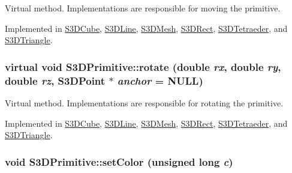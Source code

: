 Virtual method. Implementations are responsible for moving the primitive. 



Implemented in \hyperlink{class_s3_d_cube_ab21a1988528297602452984f8a3c093e}{S3DCube}, \hyperlink{class_s3_d_line_a38203e499c32f14ff5da3b7c17861881}{S3DLine}, \hyperlink{class_s3_d_mesh_a15edf10bf8a749627f11235c618734f7}{S3DMesh}, \hyperlink{class_s3_d_rect_a97fcf9a2380d07c59bc12db8bd5949bc}{S3DRect}, \hyperlink{class_s3_d_tetraeder_a3acda1d545e2f078abf299b1c424b7bc}{S3DTetraeder}, and \hyperlink{class_s3_d_triangle_a7f168122e4ed627fcb6489852a56982b}{S3DTriangle}.

\hypertarget{class_s3_d_primitive_a23eb36b6bd48643e8f7be4b950592d9e}{
\subsubsection[{rotate}]{\setlength{\rightskip}{0pt plus 5cm}virtual void S3DPrimitive::rotate (double {\em rx}, \/  double {\em ry}, \/  double {\em rz}, \/  {\bf S3DPoint} $\ast$ {\em anchor} = {\ttfamily NULL})}}
\label{class_s3_d_primitive_a23eb36b6bd48643e8f7be4b950592d9e}


Virtual method. Implementations are responsible for rotating the primitive. 



Implemented in \hyperlink{class_s3_d_cube_a2e574649ca6ddd805c5ecdb7932f3ac1}{S3DCube}, \hyperlink{class_s3_d_line_a4d23495df2c8f45855d8b80d30b01d30}{S3DLine}, \hyperlink{class_s3_d_mesh_affff1ac3ef33b293a9ec9881a4e13993}{S3DMesh}, \hyperlink{class_s3_d_rect_a1d3b8406b588abf19cff5f8a6d6de2e2}{S3DRect}, \hyperlink{class_s3_d_tetraeder_aa06cc6b851e9a3abce9f68830340007a}{S3DTetraeder}, and \hyperlink{class_s3_d_triangle_a3e739f6c9c176e58cb734db7328cf039}{S3DTriangle}.

\hypertarget{class_s3_d_primitive_a1c8f036193987522bdfb6a49b9b74000}{
\subsubsection[{setColor}]{\setlength{\rightskip}{0pt plus 5cm}void S3DPrimitive::setColor (unsigned long {\em c})}}
\label{class_s3_d_primitive_a1c8f036193987522bdfb6a49b9b74000}


